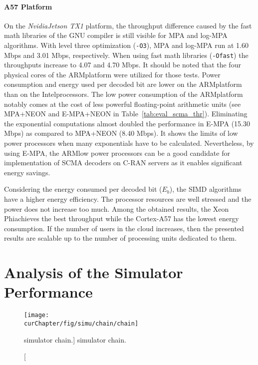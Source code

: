 \paragraph{A57 Platform}

On the \emph{Nvidia\R Jetson TX1} platform, the throughput difference caused by
the fast math libraries of the GNU compiler is still visible for MPA and log-MPA
algorithms. With level three optimization (\verb|-O3|), MPA and log-MPA run at
1.60 Mbps and 3.01 Mbps, respectively. When using fast math libraries
(\verb|-Ofast|) the throughputs increase to 4.07 and 4.70 Mbps. It should be
noted that the four physical cores of the ARM\R platform were  utilized for
those tests. Power consumption and energy used per decoded bit are lower on the
ARM\R platform than on the Intel\R processors. The low power consumption of the
ARM\R platform notably comes at the cost of less powerful floating-point
arithmetic units (see MPA+NEON and E-MPA+NEON in Table~\ref{tab:eval_scma_thr}).
Eliminating the exponential computations almost doubled the performance in E-MPA
(15.30 Mbps) as compared to MPA+NEON (8.40 Mbps). It shows the limits of low
power processors when many exponentials have to be calculated. Nevertheless, by
using E-MPA, the ARM\R low power processors can be a good candidate for
implementation of SCMA decoders on C-RAN servers as it enables significant
energy savings.

Considering the energy consumed per decoded bit ($E_b$), the SIMD algorithms
have a higher energy efficiency. The processor resources are well stressed and
the power does not increase too much. Among the obtained results, the Xeon
Phi\TM achieves the best throughput while the Cortex-A57 has the lowest energy
consumption. If the number of users in the cloud increases, then the presented
results are scalable up to the number of processing units dedicated to them.

\section{Analysis of the Simulator Performance}
\label{sec:eval_simu}

\begin{figure}[htp]
  \centering
  \texttt{[image: \\curChapter/fig/simu/chain/chain]}
  \caption
    [\AFFECT simulator chain.]
    {\AFFECT simulator chain.}
  \label{fig:simu_chain}
\end{figure}

